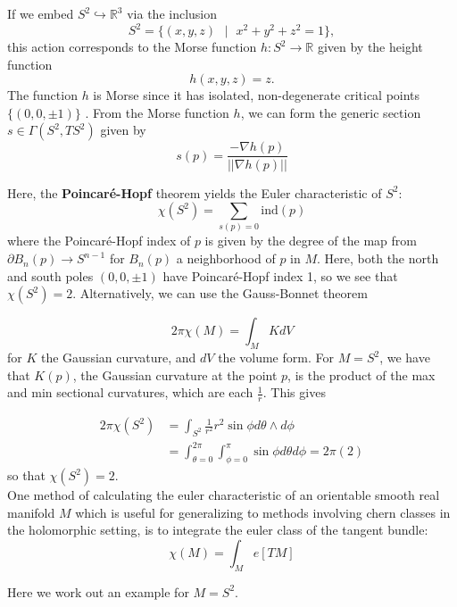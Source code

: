 \documentclass{amsart}
\newcommand{\R}{\mathbb{R}}
\begin{document}
If we embed $S^2 \hookrightarrow \R^3$ via the inclusion \[ S^2 = \{(x,y,z) \text{ }|\text{ } x^2+y^2+z^2=1\}, \] this action corresponds to the Morse function $h: S^2 \rightarrow \R$ given by the height function \[ h(x,y,z) = z. \] The function $h$ is Morse since it has isolated, non-degenerate critical points $\{(0,0,\pm 1)\}$ \cite{audin2013morse}. From the Morse function $h$, we can form the generic section $s \in \Gamma(S^2, TS^2)$ given by \[ s(p) = \frac{ -\nabla h(p) }{|| \nabla h(p) ||} \] 

Here, the \textbf{Poincar\'{e}-Hopf} theorem yields the Euler characteristic of $S^2$:\\


\[ \chi(S^2) = \sum_{s(p)=0} \text{ind}(p) \] where the Poincar\'{e}-Hopf index of $p$ is given by the degree of the map from $\partial B_n(p) \rightarrow S^{n-1}$ for $B_n(p)$ a neighborhood of $p$ in $M$. Here, both the north and south poles $(0,0,\pm 1)$ have Poincar\'{e}-Hopf index 1, so we see that $\chi(S^2)=2$. Alternatively, we can use the Gauss-Bonnet theorem

\[ 2\pi \chi(M) = \int_M K dV \] for $K$ the Gaussian curvature, and $dV$ the volume form. For $M=S^2$, we have that $K(p)$, the Gaussian curvature at the point $p$, is the product of the max and min sectional curvatures, which are each $\frac{1}{r}$. This gives 

\begin{align*}
    2\pi \chi(S^2) &= \int_{S^2} \frac{1}{r^2} r^2 \sin\phi d\theta \wedge d\phi \\
    &= \int_{\theta=0}^{2\pi} \int_{\phi=0}^\pi \sin\phi d\theta d\phi = 2\pi(2) 
\end{align*} so that $\chi(S^2)=2$.\\





One method of calculating the euler characteristic of an orientable smooth real manifold $M$ which is useful for generalizing to methods involving chern classes in the holomorphic setting, is to integrate the euler class of the tangent bundle: \[ \chi(M) = \int_{M} e[TM] \] 

Here we work out an example for $M=S^2$. 
\end{document}
